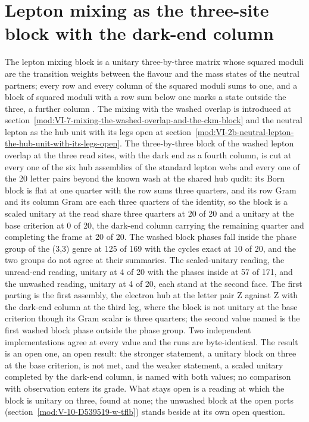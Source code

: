 \section{Lepton mixing as the three-site block with the dark-end column}\label{mod:VI-7-D539152-w-lmde}
The lepton mixing block is a unitary three-by-three matrix whose squared moduli are the transition weights between the flavour and the mass states of the neutral partners; every row and every column of the squared moduli sums to one, and a block of squared moduli with a row sum below one marks a state outside the three, a further column \cite{Pontecorvo1958,Maki1962}. The mixing with the washed overlap is introduced at section~\ref{mod:VI-7-mixing-the-washed-overlap-and-the-ckm-block} and the neutral lepton as the hub unit with its legs open at section~\ref{mod:VI-2b-neutral-lepton-the-hub-unit-with-its-legs-open}.
The three-by-three block of the washed lepton overlap at the three read sites, with the dark end as a fourth column, is cut at every one of the six hub assemblies of the standard lepton webs and every one of the 20 letter pairs beyond the known wash at the shared hub qudit: its Born block is flat at one quarter with the row sums three quarters, and its row Gram and its column Gram are each three quarters of the identity, so the block is a scaled unitary at the read share three quarters at 20 of 20 and a unitary at the base criterion at 0 of 20, the dark-end column carrying the remaining quarter and completing the frame at 20 of 20.
The washed block phases fall inside the phase group of the (3,3) genre at 125 of 169 with the cycles exact at 10 of 20, and the two groups do not agree at their summaries. The scaled-unitary reading, the unread-end reading, unitary at 4 of 20 with the phases inside at 57 of 171, and the unwashed reading, unitary at 4 of 20, each stand at the second face. The first parting is the first assembly, the electron hub at the letter pair Z against Z with the dark-end column at the third leg, where the block is not unitary at the base criterion though its Gram scalar is three quarters; the second value named is the first washed block phase outside the phase group. Two independent implementations agree at every value and the runs are byte-identical.
The result is an open one, an open result: the stronger statement, a unitary block on three at the base criterion, is not met, and the weaker statement, a scaled unitary completed by the dark-end column, is named with both values; no comparison with observation enters its grade.
What stays open is a reading at which the block is unitary on three, found at none; the unwashed block at the open ports (section~\ref{mod:V-10-D539519-w-tflb}) stands beside at its own open question.
